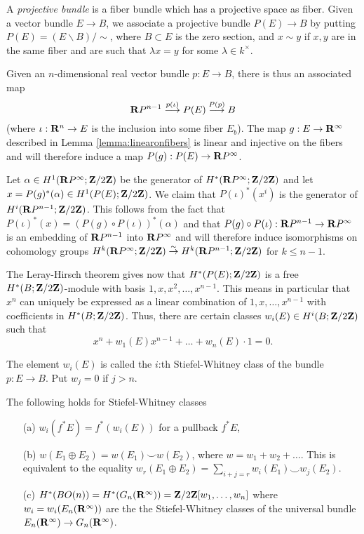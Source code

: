 \documentclass[a4paper,openany]{scrbook}
\begin{document}
A \textit{projective bundle} is a fiber bundle which has a projective space as fiber. Given a vector bundle $E \to B$, we associate a projective bundle $P(E) \to B$ by putting $P(E) = (E \backslash B)/ \sim$, where $B \subset E$ is the zero section, and $x \sim y$ if $x,y$ are in the same fiber and are such that $\lambda x = y$ for some $\lambda \in k^\times$.
	

Given an $n$-dimensional real vector bundle $p: E\to B$, there is thus an associated map
$$\mathbf R P^{n-1}\overset{p(\iota)}\longrightarrow P(E)\overset{P(p)}\longrightarrow B$$
(where $\iota:\mathbf R^n\to E$ is the inclusion into some fiber $E_b$). The map $g: E\to \mathbf R^\infty$ described in Lemma \ref{lemma:linearonfibers} is linear and injective on the fibers and will therefore induce a map $P(g):P(E)\to\mathbf R P^\infty$.

Let $\alpha\in H^1(\mathbf R P^\infty;\mathbf Z/2\mathbf Z)$ be the generator of $H^*(\mathbf R P^\infty;\mathbf Z/2\mathbf Z)$ and let $x=P(g)^*(\alpha)\in H^1(P(E);\mathbf Z/2\mathbf Z)$.
We claim  that $P(\iota)^*(x^i)$ is the generator of $H^i(\mathbf R P^{n-1};\mathbf Z/2\mathbf Z)$. This follows from the fact that $P(\iota)^*(x)= (P(g)\circ P(\iota))^*(\alpha)$ and that $P(g)\circ P(\iota):\mathbf R P^{n-1}\to \mathbf R P^\infty$ is an embedding of $\mathbf R P^{n-1}$ into $\mathbf R P^\infty$ and will therefore induce isomorphisms on cohomology groups $H^k(\mathbf R P^\infty;\mathbf Z/2\mathbf Z)\overset\sim\to H^k(\mathbf R P^{n-1};\mathbf Z/2\mathbf Z)$ for $k\leq n-1$.

The Leray-Hirsch theorem gives now that $H^*(P(E);\mathbf Z/2\mathbf Z)$ is a free $H^*(B;\mathbf Z/2\mathbf Z)$-module with basis $1,x,x^2,\dots,x^{n-1}$. This means in particular that $x^n$ can uniquely be expressed as a linear combination of $1,x,\dots,x^{n-1}$ with coefficients in $H^*(B;\mathbf Z/2\mathbf Z)$. Thus, there are certain classes $w_i(E)\in H^i(B;\mathbf Z/2\mathbf Z)$ such that
$$x^n+w_1(E)x^{n-1}+\dots+w_n(E)\cdot1=0.$$

\begin{defn}
The element $w_i(E)$ is called the $i$:th Stiefel-Whitney class of the bundle $p:E\to B$. Put $w_j=0$ if $j>n.$
\end{defn}

\begin{prop}
The following holds for Stiefel-Whitney classes
\begin{itemize}
 \item[(a)] $w_i(f^*E)=f^*(w_i(E))$ for a pullback $f^*E$,
 \item[(b)] $w(E_1\oplus E_2)= w(E_1)\smile w(E_2)$, where $w =w_1+w_2+\dots$. This is equivalent to the equality $w_r(E_1\oplus E_2)= \sum\limits_{i+j=r}w_i(E_1)\smile w_j(E_2)$.
 \item[(c)]\label{prop:cohomologyBO} $H^*(BO(n)) = H^*(G_n(\mathbf R^\infty))= \mathbf Z/2\mathbf Z[w_1,\dots,w_n]$ where $w_i=w_i(E_n(\mathbf R^\infty))$ are the the Stiefel-Whitney classes of the universal bundle $E_n(\mathbf R^\infty)\to G_n(\mathbf R^\infty)$.
\end{itemize}
\end{prop}
\end{document}

